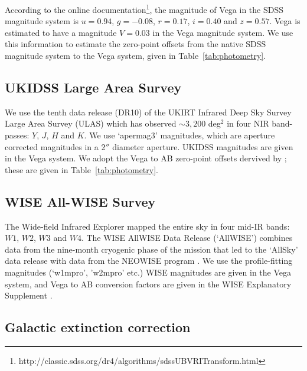 According to the online documentation\footnote{http://classic.sdss.org/dr4/algorithms/sdssUBVRITransform.html}, the magnitude of Vega in the SDSS magnitude system is $u=0.94$, $g=-0.08$, $r=0.17$, $i=0.40$ and $z=0.57$. 
Vega is estimated to have a magnitude $V=0.03$ in the Vega magnitude system. 
We use this information to estimate the zero-point offsets from the native SDSS magnitude system to the Vega system, given in Table~\ref{tab:photometry}. 

\subsection{UKIDSS Large Area Survey}

We use the tenth data release (DR10) of the UKIRT Infrared Deep Sky Survey \citep[UKIDSS;][]{lawrence07} Large Area Survey (ULAS) which has observed $\sim 3,200$ deg$^2$ in four \ac{NIR} band-passes: $Y$, $J$, $H$ and $K$. 
We use `apermag3' magnitudes, which are aperture corrected magnitudes in a 2$''$ diameter aperture.
UKIDSS magnitudes are given in the Vega system. 
We adopt the Vega to AB zero-point offsets dervived by \citet{hewett06}; these are given in Table~\ref{tab:photometry}. 

\subsection{WISE All-WISE Survey}

The Wide-field Infrared Explorer \citep[WISE;][]{wright10} mapped the entire sky in four mid-IR bands: $W1$, $W2$, $W3$ and $W4$. 
The WISE AllWISE Data Release (`AllWISE') combines data from the nine-month cryogenic phase of the mission that led to the `AllSky' data release with data from the NEOWISE program \citep{mainzer11}. 
We use the profile-fitting magnitudes (`w1mpro', 'w2mpro' etc.) 
WISE magnitudes are given in the Vega system, and Vega to AB conversion factors are given in the WISE Explanatory Supplement \citep{cutri13}.

\subsection{Galactic extinction correction}


